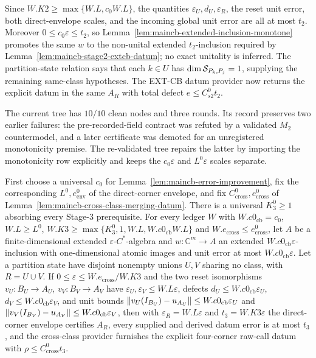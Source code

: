 Since $W.K2\ge\max\{W.L,c_{0}W.L\}$, the quantities
$\varepsilon_U,d_U,\varepsilon_R$, the reset unit error, both direct-envelope scales, and
the incoming global unit error are all at most $t_{2}$.  Moreover
$0\le c_{0}\varepsilon\le t_{2}$, so
Lemma~\ref{lem:maincb-extended-inclusion-monotone} promotes the same $w$ to the non-unital
extended $t_{2}$-inclusion required by Lemma~\ref{lem:maincb-stage2-extcb-datum}; no exact
unitality is inferred.  The partition-state relation says that each $k\in U$ has
$\dim\mathcal S_{P_k,P_j}=1$, supplying the remaining same-class hypotheses.  The EXT-CB datum
provider now returns the explicit datum in the same $A_R$ with total defect
$e\le C_{s2}^{0}t_{2}$.

The current tree has $10/10$ clean nodes and three rounds.  Its record preserves two
earlier failures: the pre-recorded-field contract was refuted by a validated $M_2$
countermodel, and a later certificate was demoted for an unregistered monotonicity premise.
The re-validated tree repairs the latter by importing the monotonicity row explicitly and
keeps the $c_{0}\varepsilon$ and $L^{0}\varepsilon$ scales separate.

\begin{lemma}\label{lem:maincb-stage3-call-envelope}
First choose a universal $c_{0}$ for Lemma~\ref{lem:maincb-error-improvement}, fix the
corresponding $L^{0},e_{\mathrm{env}}^{0}$ of the direct-corner envelope, and fix
$C_{\mathrm{cross}}^{0},e_{\mathrm{cross}}^{0}$ of
Lemma~\ref{lem:maincb-cross-class-merging-datum}.  There is a universal $K_{3}^{0}\ge1$
absorbing every Stage-3 prerequisite.  For every ledger $W$ with
$W.c0_{\mathrm{cb}}=c_0$, $W.L\ge L^0$,
$W.K3\ge\max\{K_3^0,1,W.L,W.c0_{\mathrm{cb}}W.L\}$ and
$W.e_{\mathrm{cross}}\le e_{\mathrm{cross}}^0$, let $A$ be a finite-dimensional extended
$\varepsilon$-$C^*$-algebra and $w:\mathbb C^m\to A$ an extended
$W.c0_{\mathrm{cb}}\varepsilon$-inclusion with one-dimensional atomic images and unit error
at most $W.c0_{\mathrm{cb}}\varepsilon$.  Let a partition state have disjoint nonempty
unions $U,V$ sharing no class, with $R=U\cup V$.  If
$0\le\varepsilon\le W.e_{\mathrm{cross}}/W.K3$ and the two reset isomorphisms
$v_U:B_U\to A_U$, $v_V:B_V\to A_V$ have
$\varepsilon_U,\varepsilon_V\le W.L\varepsilon$, defects
$d_U\le W.c0_{\mathrm{cb}}\varepsilon_U$, $d_V\le W.c0_{\mathrm{cb}}\varepsilon_V$, and
unit bounds $\lVert v_U(I_{B_U})-u_{A_U}\rVert\le W.c0_{\mathrm{cb}}\varepsilon_U$ and
$\lVert v_V(I_{B_V})-u_{A_V}\rVert\le W.c0_{\mathrm{cb}}\varepsilon_V$, then with
$\varepsilon_R=W.L\varepsilon$ and $t_{3}=W.K3\varepsilon$ the direct-corner envelope
certifies $A_R$, every supplied and derived datum error is at most $t_{3}$, and the
cross-class provider furnishes the explicit four-corner raw-call datum with
$\rho\le C_{\mathrm{cross}}^{0}t_{3}$.
\end{lemma}

